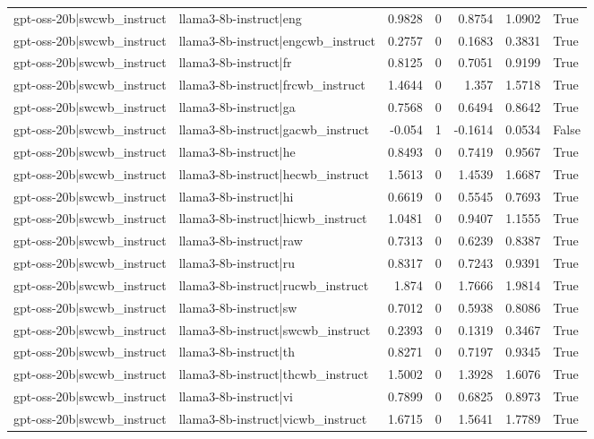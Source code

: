 \begin{table}
\begin{tabular}{l l r r r r l}
gpt-oss-20b|swcwb_instruct & llama3-8b-instruct|eng & 0.9828 & 0 & 0.8754 & 1.0902 & True \\
gpt-oss-20b|swcwb_instruct & llama3-8b-instruct|engcwb_instruct & 0.2757 & 0 & 0.1683 & 0.3831 & True \\
gpt-oss-20b|swcwb_instruct & llama3-8b-instruct|fr & 0.8125 & 0 & 0.7051 & 0.9199 & True \\
gpt-oss-20b|swcwb_instruct & llama3-8b-instruct|frcwb_instruct & 1.4644 & 0 & 1.357 & 1.5718 & True \\
gpt-oss-20b|swcwb_instruct & llama3-8b-instruct|ga & 0.7568 & 0 & 0.6494 & 0.8642 & True \\
gpt-oss-20b|swcwb_instruct & llama3-8b-instruct|gacwb_instruct & -0.054 & 1 & -0.1614 & 0.0534 & False \\
gpt-oss-20b|swcwb_instruct & llama3-8b-instruct|he & 0.8493 & 0 & 0.7419 & 0.9567 & True \\
gpt-oss-20b|swcwb_instruct & llama3-8b-instruct|hecwb_instruct & 1.5613 & 0 & 1.4539 & 1.6687 & True \\
gpt-oss-20b|swcwb_instruct & llama3-8b-instruct|hi & 0.6619 & 0 & 0.5545 & 0.7693 & True \\
gpt-oss-20b|swcwb_instruct & llama3-8b-instruct|hicwb_instruct & 1.0481 & 0 & 0.9407 & 1.1555 & True \\
gpt-oss-20b|swcwb_instruct & llama3-8b-instruct|raw & 0.7313 & 0 & 0.6239 & 0.8387 & True \\
gpt-oss-20b|swcwb_instruct & llama3-8b-instruct|ru & 0.8317 & 0 & 0.7243 & 0.9391 & True \\
gpt-oss-20b|swcwb_instruct & llama3-8b-instruct|rucwb_instruct & 1.874 & 0 & 1.7666 & 1.9814 & True \\
gpt-oss-20b|swcwb_instruct & llama3-8b-instruct|sw & 0.7012 & 0 & 0.5938 & 0.8086 & True \\
gpt-oss-20b|swcwb_instruct & llama3-8b-instruct|swcwb_instruct & 0.2393 & 0 & 0.1319 & 0.3467 & True \\
gpt-oss-20b|swcwb_instruct & llama3-8b-instruct|th & 0.8271 & 0 & 0.7197 & 0.9345 & True \\
gpt-oss-20b|swcwb_instruct & llama3-8b-instruct|thcwb_instruct & 1.5002 & 0 & 1.3928 & 1.6076 & True \\
gpt-oss-20b|swcwb_instruct & llama3-8b-instruct|vi & 0.7899 & 0 & 0.6825 & 0.8973 & True \\
gpt-oss-20b|swcwb_instruct & llama3-8b-instruct|vicwb_instruct & 1.6715 & 0 & 1.5641 & 1.7789 & True \\

\end{tabular}
\end{table}
